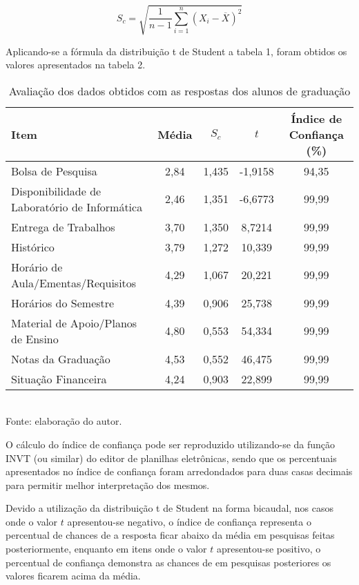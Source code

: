 \begin{equation} \label{eq:desvpad}
S_c = \sqrt{\frac{1}{n - 1} \sum_{i = 1}^{n} (X_i - \overline{X})^2}
\end{equation}

Aplicando-se a fórmula da distribuição t de Student a tabela 1, foram obtidos os valores apresentados na tabela 2.

\begin{table}[!hbt]
\centering
\caption[Avaliação dos dados obtidos - Graduação]{Avaliação dos dados obtidos com as respostas dos alunos de graduação}
\vspace{3mm}
\begin{tabular}{p{5cm}|c|c|c|c}\hline
\textbf{Item} & \textbf{Média} & \textbf{$S_c$} & \textbf{$t$} & \textbf{Índice de Confiança (\%)} \\ \hline
Bolsa de Pesquisa & 2,84 & 1,435 & -1,9158 & 94,35 \\ \hline
Disponibilidade de Laboratório de Informática & 2,46 & 1,351 & -6,6773 & 99,99 \\ \hline
Entrega de Trabalhos & 3,70 & 1,350 & 8,7214 & 99,99 \\ \hline
Histórico & 3,79 & 1,272 & 10,339 & 99,99 \\ \hline
Horário de Aula/Ementas/Requisitos & 4,29 & 1,067 & 20,221 & 99,99  \\ \hline
Horários do Semestre & 4,39 & 0,906 & 25,738 & 99,99 \\ \hline
Material de Apoio/Planos de Ensino & 4,80 & 0,553 & 54,334 & 99,99 \\ \hline
Notas da Graduação & 4,53 & 0,552 & 46,475 & 99,99 \\ \hline
Situação Financeira & 4,24 & 0,903 & 22,899 & 99,99 \\ \hline
\end{tabular}
\\ Fonte: elaboração do autor.
\end{table}

O cálculo do índice de confiança pode ser reproduzido utilizando-se da função INVT (ou similar) do editor de planilhas eletrônicas, sendo que os percentuais apresentados no índice de confiança foram arredondados para duas casas decimais para permitir melhor interpretação dos mesmos. 

Devido a utilização da  distribuição t de Student na forma bicaudal, nos casos onde o valor $t$ apresentou-se negativo, o índice de confiança representa o percentual de chances de a resposta ficar abaixo da média em pesquisas feitas posteriormente, enquanto em itens onde o valor $t$ apresentou-se positivo, o percentual de confiança demonstra as chances de em pesquisas posteriores os valores ficarem acima da média.

